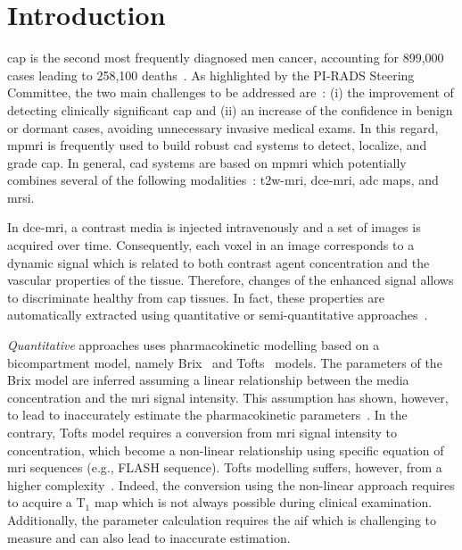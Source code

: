 \section{Introduction}

\Ac{cap} is the second most frequently diagnosed men cancer, accounting for 899,000 cases leading to 258,100 deaths~\citep{ferlay2010estimates}.
As highlighted by the PI-RADS Steering Committee, the two main challenges to be addressed are~\citep{weinreb2016pi}:
(i) the improvement of detecting clinically significant \ac{cap} and
(ii) an increase of the confidence in benign or dormant cases, avoiding unnecessary invasive medical exams.
In this regard, \ac{mpmri} is frequently used to build robust \ac{cad} systems to detect, localize, and grade \ac{cap}.
In general, \ac{cad} systems are based on \ac{mpmri} which potentially combines several of the following modalities~\citep{lemaitre2015computer}: \ac{t2w}-\ac{mri}, \ac{dce}-\ac{mri}, \ac{adc} maps, and \ac{mrsi}.

In \ac{dce}-\ac{mri}, a contrast media is injected intravenously and a set of images is acquired over time.
Consequently, each voxel in an image corresponds to a dynamic signal which is related to both contrast agent concentration and the vascular properties of the tissue.
Therefore, changes of the enhanced signal allows to discriminate healthy from \ac{cap} tissues.
In fact, these properties are automatically extracted using quantitative or semi-quantitative approaches~\citep{lemaitre2015computer}.

\emph{Quantitative} approaches uses pharmacokinetic modelling based on a bicompartment model, namely Brix~\citep{brix1991pharmacokinetic} and Tofts~\citep{tofts1995quantitative} models.
The parameters of the Brix model are inferred assuming a linear relationship between the media concentration and the \ac{mri} signal intensity.
This assumption has shown, however, to lead to inaccurately estimate the pharmacokinetic parameters~\citep{heilmann2006determination}.
In the contrary, Tofts model requires a conversion from \ac{mri} signal intensity to concentration, which become a non-linear relationship using specific equation of \ac{mri} sequences (e.g., FLASH sequence).
Tofts modelling suffers, however, from a higher complexity~\citep{gliozzi2011phenomenological}.
Indeed, the conversion using the non-linear approach requires to acquire a T$_1$ map which is not always possible during clinical examination.
Additionally, the parameter calculation requires the \ac{aif} which is challenging to measure and can also lead to inaccurate estimation.

